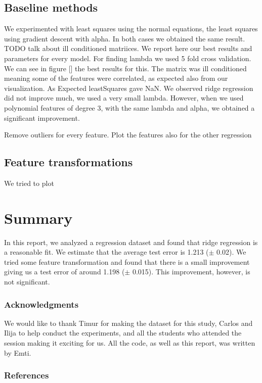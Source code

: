 \documentclass{article} %
\begin{document}
\subsection{Baseline methods}
 We experimented with least squares using the normal equations, the least squares using gradient descent with alpha.  In both cases we obtained the same result. TODO talk about ill conditioned matriices.
 We report here our best results and parameters for every model. 
 For finding lambda we used 5 fold cross validation. We can see in figure [] the best results for this.
 The matrix was ill conditioned meaning some of the features were correlated, as expected also from our visualization. As Expected leastSquares gave NaN. We observed ridge regression did not improve much, we used a very small lambda. However, when we used polynomial features of degree 3,  with the same lambda and alpha, we obtained a significant improvement.
 
 Remove outliers for every feature. Plot the features also for the other regression


\subsection{Feature transformations}
We tried to plot


\section{Summary}
In this report, we analyzed a regression dataset and found that ridge regression is a reasonable fit. We estimate that the average test error is 1.213 ($\pm$ 0.02). We tried some feature transformation and found that there is a small improvement giving us a test error of around 1.198 ($\pm$ 0.015). This improvement, however, is not significant.


\subsubsection*{Acknowledgments}
We would like to thank Timur for making the dataset for this study, Carlos and Ilija to help conduct the experiments, and all the students who attended the session making it exciting for us. All the code, as well as this report, was written by Emti. 

\subsubsection*{References}
\end{document}
